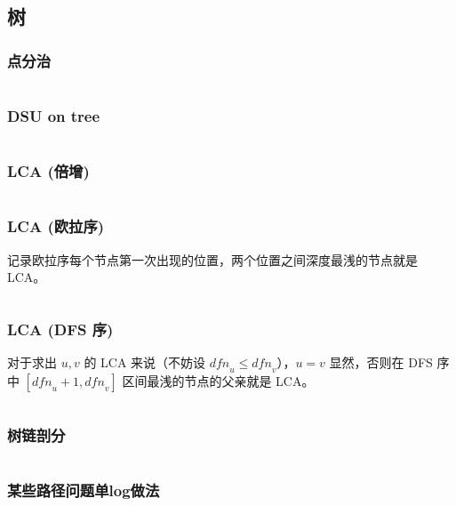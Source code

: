 \documentclass[twoside,twocolumn]{article}
\begin{document}
\subsection{树}

\subsubsection{点分治} %
\inputminted[breaklines, frame=single]{c++}{../algo/图论/树/点分治.cpp}

\subsubsection{DSU on tree} %
\inputminted[breaklines, frame=single]{c++}{../algo/图论/树/dsu_on_tree.cpp}


\subsubsection{LCA (倍增)} %
\inputminted[breaklines, frame=single]{c++}{../algo/图论/树/LCA【倍增】.cpp}


\subsubsection{LCA (欧拉序)} %
记录欧拉序每个节点第一次出现的位置，两个位置之间深度最浅的节点就是 LCA。
\inputminted[breaklines, frame=single]{c++}{../algo/图论/树/LCA【欧拉序】.cpp}


\subsubsection{LCA (DFS 序)} %
对于求出 $u,v$ 的 LCA 来说（不妨设 $\textit{dfn}_u\le \textit{dfn}_v$），$u=v$ 显然，否则在 DFS 序中 $[\textit{dfn}_u+1,\textit{dfn}_v]$ 区间最浅的节点的父亲就是 LCA。
\inputminted[breaklines, frame=single]{c++}{../algo/图论/树/LCA【dfs序】.cpp}



\subsubsection{树链剖分} %
\inputminted[breaklines, frame=single]{c++}{../algo/图论/树/树链剖分【非封装版】.cpp}

\subsubsection{某些路径问题单log做法} %
\end{document}
